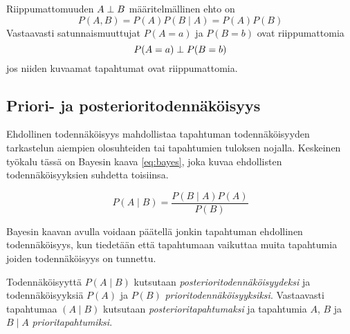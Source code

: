 Riippumattomuuden $A \perp B$ määritelmällinen ehto on 
$$ 
    P(A,B) = P(A)P(B \mid A) = P(A)P(B)  
$$  
Vastaavasti satunnaismuuttujat $P(A = a)$ ja $P(B = b)$ ovat riippumattomia  
$$ 
    P(A = a)  \perp P(B = b) 
$$ 
jos niiden kuvaamat tapahtumat ovat riippumattomia.  

\subsection{Priori- ja posterioritodennäköisyys} 

Ehdollinen todennäköisyys mahdollistaa tapahtuman todennäköisyyden tarkastelun aiempien olosuhteiden tai tapahtumien tuloksen nojalla. Keskeinen työkalu tässä on Bayesin kaava \ref{eq:bayes}, joka kuvaa ehdollisten todennäköisyyksien suhdetta toisiinsa. 

\begin{equation}\label{eq:bayes} 
        P(A \mid B) = \frac{P(B \mid A)P(A)}{P(B)} 
\end{equation} 

Bayesin kaavan avulla voidaan päätellä jonkin tapahtuman ehdollinen todennäköisyys, kun tiedetään että tapahtumaan vaikuttaa muita tapahtumia joiden todennäköisyys on tunnettu. 

Todennäköisyyttä $P(A \mid B)$ kutsutaan \emph{posterioritodennäköisyydeksi} ja todennäköisyyksiä $P(A)$ ja $P(B)$ \emph{prioritodennäköisyyksiksi}. Vastaavasti tapahtumaa $(A \mid B)$ kutsutaan \emph{posterioritapahtumaksi} ja tapahtumia $A$, $B$ ja $B \mid A$ \emph{prioritapahtumiksi}. 